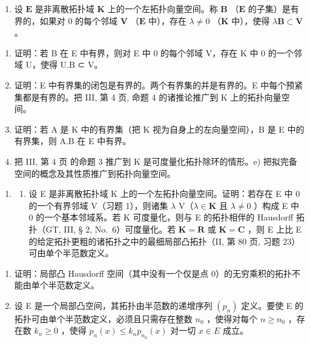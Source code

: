 \exercisegroup

\begin{enumerate}
\def\labelenumi{\arabic{enumi})}
\tightlist
\item
  设 \(\mathbf{E}\) 是非离散拓扑域 \(\mathbf{K}\) 上的一个左拓扑向量空间。称 \(\mathbf{B}\) （\(\mathbf{E}\) 的子集）是有界的，如果对 0 的每个邻域 \(\mathbf{V}\) （\(\mathbf{E}\) 中），存在 \(\lambda \neq 0\) （\(\mathbf{K}\) 中），使得 \(\lambda \mathbf{B} \subset \mathbf{V}\) 。
\end{enumerate}

\begin{enumerate}
\def\labelenumi{\alph{enumi})}
\item
  证明：若 B 在 E 中有界，则对 E 中 0 的每个邻域 V，存在 K 中 0 的一个邻域 U，使得 U.B ⊂ V。
\item
  证明：E 中有界集的闭包是有界的。两个有界集的并是有界的。E 中每个预紧集都是有界的。把 III, 第 4 页, 命题 4 的诸推论推广到 K 上的拓扑向量空间。
\item
  证明：若 A 是 K 中的有界集（把 K 视为自身上的左向量空间），B 是 E 中的有界集，则 A.B 在 E 中有界。
\item
  把 III, 第 4 页 的命题 3 推广到 K 是可度量化拓扑除环的情形。e) 把拟完备空间的概念及其性质推广到拓扑向量空间。
\end{enumerate}

\begin{enumerate}
\def\labelenumi{\arabic{enumi})}
\setcounter{enumi}{1}
\tightlist
\item
  \begin{enumerate}
  \def\labelenumii{\alph{enumii})}
  \tightlist
  \item
    设 E 是非离散拓扑域 K 上的一个左拓扑向量空间。证明：若存在 E 中 0 的一个有界邻域 V（习题 1），则诸集 \(\lambda\) V（\(\lambda \in \mathbf{K}\) 且 \(\lambda \neq 0\) ）构成 E 中 0 的一个基本邻域系。若 K 可度量化，则与 E 的拓扑相伴的 Hausdorff 拓扑（GT, III, § 2, No.~6）可度量化。若 \(\mathbf{K} = \mathbf{R}\) 或 \(\mathbf{K} = \mathbf{C}\) ，则 E 上比 E 的给定拓扑更粗的诸拓扑之中的最细局部凸拓扑（II, 第 80 页, 习题 23）可由单个半范数定义。
  \end{enumerate}
\end{enumerate}

\begin{enumerate}
\def\labelenumi{\alph{enumi})}
\setcounter{enumi}{1}
\item
  证明：局部凸 Hausdorff 空间（其中没有一个仅是点 0）的无穷乘积的拓扑不能由单个半范数定义。
\item
  设 E 是一个局部凸空间，其拓扑由半范数的递增序列 \((p_n)\) 定义。要使 E 的拓扑可由单个半范数定义，必须且只需存在整数 \(n_0\) ，使得对每个 \(n \geqslant n_0\) ，存在数 \(k_n \geqslant 0\) ，使得 \(p_n(x) \leqslant k_n p_{n_0}(x)\) 对一切 \(x \in E\) 成立。
\end{enumerate}

